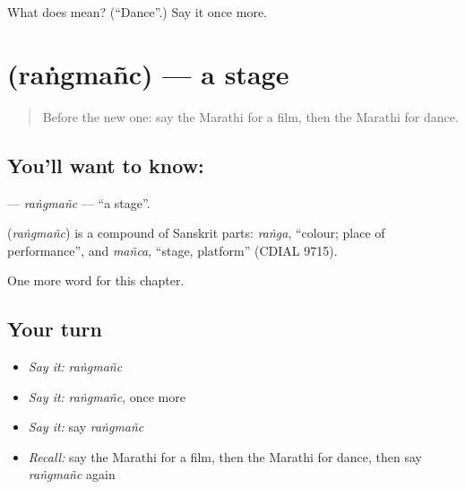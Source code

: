 \begin{tcolorbox}[breakable,colback=teal!4,colframe=teal!35!black,title={Before you move on}]
What does  mean? (\textquotedblleft{}Dance\textquotedblright{}.) Say it once more.
\end{tcolorbox}
\section[\texorpdfstring{\mr{रंगमंच} (raṅgmañc)}{रंगमंच (raṅgmañc)}]{ (raṅgmañc) — a stage}

\label{lesson:MR-C275-rangmanc}



\begin{quote}
Before the new one: say the Marathi for a film, then the Marathi for dance.
\end{quote}

\subsection*{You'll want to know: }
\textbf{} — \emph{raṅgmañc} — \textquotedblleft{}a stage\textquotedblright{}.

\begin{cousinweb}
\textbf{} (\emph{raṅgmañc}) is a compound of Sanskrit parts: \emph{raṅga}, \textquotedblleft{}colour; place of performance\textquotedblright{}, and \emph{mañca}, \textquotedblleft{}stage, platform\textquotedblright{} (CDIAL 9715).
\end{cousinweb}

\begin{grammarlens}[title={What you've built}]
One more word for this chapter.
\end{grammarlens}

\subsection*{Your turn}
\begin{itemize}
\raggedright
  \item \emph{Say it:} \emph{raṅgmañc}
  \item \emph{Say it:} \emph{raṅgmañc}, once more
  \item \emph{Say it:} say \emph{raṅgmañc}
  \item \emph{Recall:} say the Marathi for a film, then the Marathi for dance, then say \emph{raṅgmañc} again
\end{itemize}

